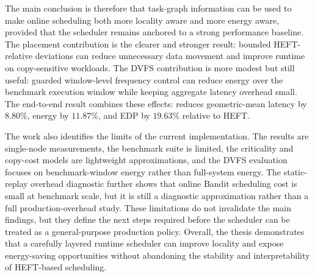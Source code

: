 The main conclusion is therefore that \CUDASTF{} task-graph information can be
used to make online scheduling both more locality aware and more energy aware,
provided that the scheduler remains anchored to a strong performance baseline.
The placement contribution is the clearer and stronger result: bounded
HEFT-relative deviations can reduce unnecessary data movement and improve
runtime on copy-sensitive workloads. The DVFS contribution is more modest but
still useful: guarded window-level frequency control can reduce energy over
the benchmark execution window while keeping aggregate latency overhead small.
The end-to-end result combines these effects: \BanditWinDVFS{} reduces
geometric-mean latency by \(8.80\%\), energy by \(11.87\%\), and EDP by
\(19.63\%\) relative to HEFT.

The work also identifies the limits of the current implementation. The results
are single-node measurements, the benchmark suite is limited, the criticality
and copy-cost models are lightweight approximations, and the DVFS evaluation
focuses on benchmark-window energy rather than full-system energy. The
static-replay overhead diagnostic further shows that online Bandit scheduling
cost is small at benchmark scale, but it is still a diagnostic approximation
rather than a full production-overhead study. These limitations do not
invalidate the main findings, but they define the next steps required before
the scheduler can be treated as a general-purpose production policy. Overall,
the thesis demonstrates that a carefully layered runtime scheduler can improve
locality and expose energy-saving opportunities without abandoning the
stability and interpretability of HEFT-based scheduling.
